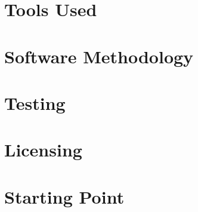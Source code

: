 \section{Tools Used}


\section{Software Methodology}

\section{Testing}

\section{Licensing}

\section{Starting Point}
